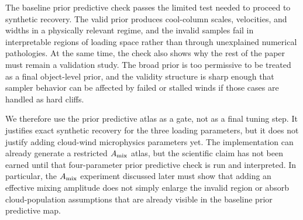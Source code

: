 The baseline prior predictive check passes the limited test needed to proceed
to synthetic recovery.  The valid prior produces cool-column scales, velocities,
and widths in a physically relevant regime, and the invalid samples fail in
interpretable regions of loading space rather than through unexplained numerical
pathologies.  At the same time, the check also shows why the rest of the paper
must remain a validation study.  The broad prior is too permissive to be treated
as a final object-level prior, and the validity structure is sharp enough that
sampler behavior can be affected by failed or stalled winds if those cases are
handled as hard cliffs.

We therefore use the prior predictive atlas as a gate, not as a final tuning
step.  It justifies exact synthetic recovery for the three loading parameters,
but it does not justify adding cloud-wind microphysics parameters yet.  The
implementation can already generate a restricted $A_{\rm mix}$ atlas, but the
scientific claim has not been earned until that four-parameter prior predictive
check is run and interpreted.  In particular, the $A_{\rm mix}$ experiment
discussed later must show that adding an effective mixing amplitude does not
simply enlarge the invalid region or absorb cloud-population assumptions that
are already visible in the baseline prior predictive map.
